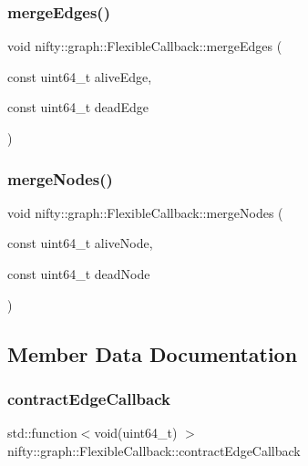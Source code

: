 \subsubsection{\texorpdfstring{merge\+Edges()}{mergeEdges()}}
{\footnotesize\ttfamily void nifty\+::graph\+::\+Flexible\+Callback\+::merge\+Edges (\begin{DoxyParamCaption}\item[{const uint64\+\_\+t}]{alive\+Edge,  }\item[{const uint64\+\_\+t}]{dead\+Edge }\end{DoxyParamCaption})\hspace{0.3cm}{\ttfamily [inline]}}

\mbox{\label{structnifty_1_1graph_1_1FlexibleCallback_aac9ed0c77a9fc3a45381c31394a757ea}} 
\subsubsection{\texorpdfstring{merge\+Nodes()}{mergeNodes()}}
{\footnotesize\ttfamily void nifty\+::graph\+::\+Flexible\+Callback\+::merge\+Nodes (\begin{DoxyParamCaption}\item[{const uint64\+\_\+t}]{alive\+Node,  }\item[{const uint64\+\_\+t}]{dead\+Node }\end{DoxyParamCaption})\hspace{0.3cm}{\ttfamily [inline]}}



\subsection{Member Data Documentation}
\mbox{\label{structnifty_1_1graph_1_1FlexibleCallback_a256c9d832090fe82b2f7fdb9f6e07920}} 
\subsubsection{\texorpdfstring{contract\+Edge\+Callback}{contractEdgeCallback}}
{\footnotesize\ttfamily std\+::function$<$void(uint64\+\_\+t) $>$ nifty\+::graph\+::\+Flexible\+Callback\+::contract\+Edge\+Callback}

